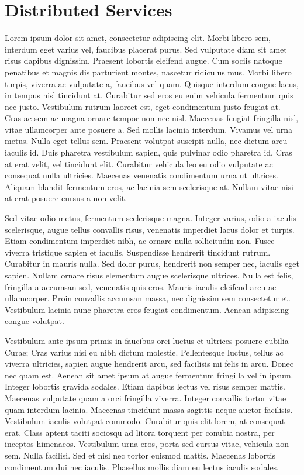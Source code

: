 \chapter{Distributed Services}

Lorem ipsum dolor sit amet, consectetur adipiscing elit. Morbi libero sem,
interdum eget varius vel, faucibus placerat purus. Sed vulputate diam sit amet
risus dapibus dignissim. Praesent lobortis eleifend augue. Cum sociis natoque
penatibus et magnis dis parturient montes, nascetur ridiculus mus. Morbi libero
turpis, viverra ac vulputate a, faucibus vel quam. Quisque interdum congue
lacus, in tempus nisl tincidunt at. Curabitur sed eros eu enim vehicula
fermentum quis nec justo. Vestibulum rutrum laoreet est, eget condimentum justo
feugiat at. Cras ac sem ac magna ornare tempor non nec nisl. Maecenas feugiat
fringilla nisl, vitae ullamcorper ante posuere a. Sed mollis lacinia interdum.
Vivamus vel urna metus. Nulla eget tellus sem. Praesent volutpat suscipit nulla,
nec dictum arcu iaculis id. Duis pharetra vestibulum sapien, quis pulvinar odio
pharetra id. Cras at erat velit, vel tincidunt elit. Curabitur vehicula leo eu
odio vulputate ac consequat nulla ultricies. Maecenas venenatis condimentum
urna ut ultrices. Aliquam blandit fermentum eros, ac lacinia sem scelerisque
at. Nullam vitae nisi at erat posuere cursus a non velit.


Sed vitae odio metus, fermentum scelerisque magna. Integer varius, odio a
iaculis scelerisque, augue tellus convallis risus, venenatis imperdiet lacus
dolor et turpis. Etiam condimentum imperdiet nibh, ac ornare nulla sollicitudin
non. Fusce viverra tristique sapien et iaculis. Suspendisse hendrerit tincidunt
rutrum. Curabitur in mauris nulla. Sed dolor purus, hendrerit non semper nec,
iaculis eget sapien. Nullam ornare risus elementum augue scelerisque ultrices.
Nulla est felis, fringilla a accumsan sed, venenatis quis eros. Mauris iaculis
eleifend arcu ac ullamcorper. Proin convallis accumsan massa, nec dignissim sem
consectetur et. Vestibulum lacinia nunc pharetra eros feugiat condimentum.
Aenean adipiscing congue volutpat.


Vestibulum ante ipsum primis in faucibus orci luctus et ultrices posuere cubilia
Curae; Cras varius nisi eu nibh dictum molestie. Pellentesque luctus, tellus ac
viverra ultricies, sapien augue hendrerit arcu, sed facilisis mi felis in arcu.
Donec nec quam est. Aenean sit amet ipsum at augue fermentum fringilla vel in
ipsum. Integer lobortis gravida sodales. Etiam dapibus lectus vel risus semper
mattis. Maecenas vulputate quam a orci fringilla viverra. Integer convallis
tortor vitae quam interdum lacinia. Maecenas tincidunt massa sagittis neque
auctor facilisis. Vestibulum iaculis volutpat commodo. Curabitur quis elit lorem,
at consequat erat. Class aptent taciti sociosqu ad litora torquent per conubia
nostra, per inceptos himenaeos. Vestibulum urna eros, porta sed cursus vitae,
vehicula non sem. Nulla facilisi. Sed et nisl nec tortor euismod mattis.
Maecenas lobortis condimentum dui nec iaculis. Phasellus mollis diam eu lectus
iaculis sodales.


